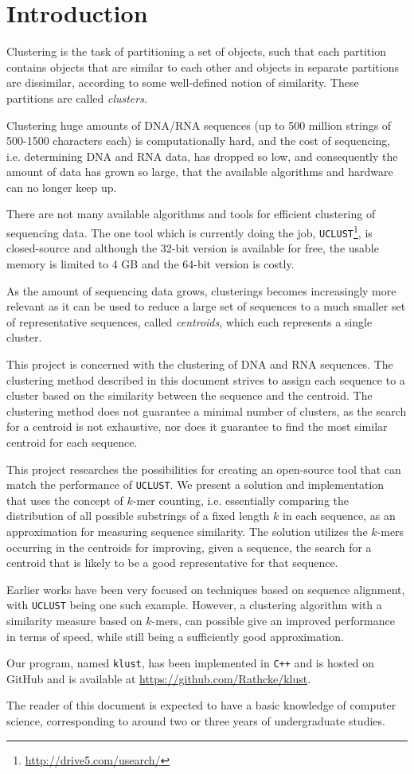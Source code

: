 \section{Introduction}

Clustering is the task of partitioning a set of objects, such that each
partition contains objects that are similar to each other and objects in
separate partitions are dissimilar, according to some well-defined notion of
similarity. These partitions are called \emph{clusters}.

Clustering huge amounts of DNA/RNA sequences (up to 500 million strings of
500-1500 characters each) is computationally hard, and the cost of sequencing,
i.e. determining DNA and RNA data, has dropped so low, and consequently the
amount of data has grown so large, that the available algorithms and hardware
can no longer keep up.~\cite{rothberg}

There are not many available algorithms and tools for efficient clustering of
sequencing data. The one tool which is currently doing the job,
\texttt{UCLUST}\footnote{\url{http://drive5.com/usearch/}}, is closed-source
and although the 32-bit version is available for free, the usable memory is
limited to 4 GB and the 64-bit version is costly.

As the amount of sequencing data grows, clusterings becomes increasingly more
relevant as it can be used to reduce a large set of sequences to a much smaller
set of representative sequences, called \emph{centroids}, which each represents
a single cluster.

This project is concerned with the clustering of DNA and RNA sequences. The
clustering method described in this document strives to assign each sequence to
a cluster based on the similarity between the sequence and the centroid. The
clustering method does not guarantee a minimal number of clusters, as the
search for a centroid is not exhaustive, nor does it guarantee to find the most
similar centroid for each sequence.

This project researches the possibilities for creating an open-source tool that
can match the performance of \texttt{UCLUST}. We present a solution and
implementation that uses the concept of $k$-mer counting, i.e. essentially
comparing the distribution of all possible substrings of a fixed length $k$ in
each sequence, as an approximation for measuring sequence similarity. The solution
utilizes the $k$-mers occurring in the centroids for improving, given a
sequence, the search for a centroid that is likely to be a good representative
for that sequence.

Earlier works have been very focused on techniques based on sequence alignment,
with \texttt{UCLUST} being one such example. However, a clustering algorithm
with a similarity measure based on $k$-mers, can possible give an improved
performance in terms of speed, while still being a sufficiently good approximation.

Our program, named \texttt{klust}, has been implemented in \texttt{C++} and is
hosted on GitHub and is available at \url{https://github.com/Rathcke/klust}.

The reader of this document is expected to have a basic knowledge of computer
science, corresponding to around two or three years of undergraduate studies.